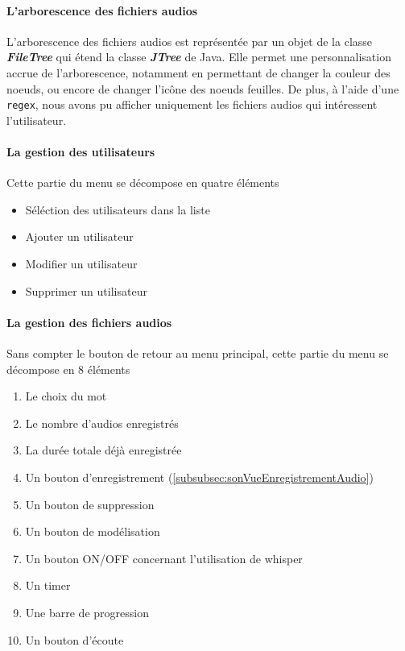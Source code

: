 \paragraph{L'arborescence des fichiers audios}

L'arborescence des fichiers audios est représentée par un objet de la classe
\textbf{\textit{FileTree}} qui étend la classe \textbf{\textit{JTree}} de Java.
Elle permet une personnalisation accrue de l'arborescence, notamment en
permettant de changer la couleur des noeuds, ou encore de changer l'icône des
noeuds feuilles. De plus, à l'aide d'une \texttt{regex}, nous avons pu afficher
uniquement les fichiers audios qui intéressent l'utilisateur.

\paragraph{La gestion des utilisateurs}
Cette partie du menu se décompose en quatre éléments
\begin{itemize}
    \item{Séléction des utilisateurs dans la liste}
    \item{Ajouter un utilisateur}
    \item{Modifier un utilisateur}
    \item{Supprimer un utilisateur}
\end{itemize}

\paragraph{La gestion des fichiers audios}

Sans compter le bouton de retour au menu principal, cette partie du menu se
décompose en 8 éléments

\begin{enumerate}
    \item{Le choix du mot}
    \item{Le nombre d'audios enregistrés}
    \item{La durée totale déjà enregistrée}
    \item{Un bouton d'enregistrement} (\ref{subsubsec:sonVueEnregistrementAudio})
    \item{Un bouton de suppression}
    \item{Un bouton de modélisation}
    \item{Un bouton ON/OFF concernant l'utilisation de whisper}
    \item{Un timer}
    \item{Une barre de progression}
    \item{Un bouton d'écoute}
\end{enumerate}


